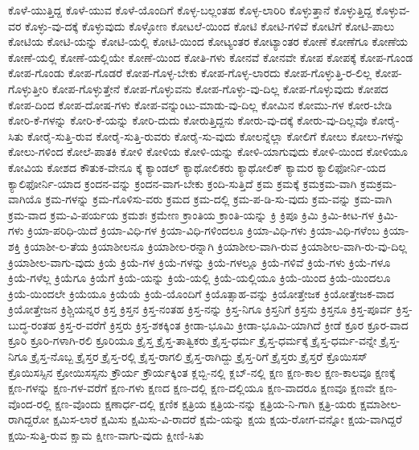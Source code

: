 {ಕೊಳೆ-ಯುತ್ತಿದ್ದ
ಕೊಳೆ-ಯುವ
ಕೊಳೆ-ಯೊಂದಿಗೆ
ಕೊಳ್ಳ-ಬಲ್ಲಂತಹ
ಕೊಳ್ಳ-ಲಾರಿರಿ
ಕೊಳ್ಳುತ್ತಾನೆ
ಕೊಳ್ಳುತ್ತಿದ್ದ
ಕೊಳ್ಳುವ-ವರ
ಕೊಳ್ಳು-ವು-ದಕ್ಕೆ
ಕೊಳ್ಳುವುದು
ಕೊಳ್ಳೋಣ
ಕೋಟಲೆ-ಯಿಂದ
ಕೋಟಿ
ಕೋಟಿ-ಗಳಿವೆ
ಕೋಟಿಗೆ
ಕೋಟಿ-ಪಾಲು
ಕೋಟಿಯ
ಕೋಟಿ-ಯನ್ನು
ಕೋಟಿ-ಯಲ್ಲಿ
ಕೋಟಿ-ಯಿಂದ
ಕೋಟ್ಯಂತರ
ಕೋಟ್ಯಾಂತರ
ಕೋಣೆ
ಕೋಣೆಗೂ
ಕೋಣೆಯ
ಕೋಣೆ-ಯಲ್ಲಿ
ಕೋಣೆ-ಯಲ್ಲಿಯೇ
ಕೋಣೆ-ಯಿಂದ
ಕೋತಿ-ಗಳು
ಕೋನವೆ
ಕೋನವೇ
ಕೋಪ
ಕೋಪಕ್ಕೆ
ಕೋಪ-ಗೊಂಡ
ಕೋಪ-ಗೊಂಡು
ಕೋಪ-ಗೊಡರೆ
ಕೋಪ-ಗೊಳ್ಳ-ಬೇಕು
ಕೋಪ-ಗೊಳ್ಳ-ಲಾರದು
ಕೋಪ-ಗೊಳ್ಳುತ್ತಿ-ರ-ಲಿಲ್ಲ
ಕೋಪ-ಗೊಳ್ಳುತ್ತೀರಿ
ಕೋಪ-ಗೊಳ್ಳುತ್ತೇನೆ
ಕೋಪ-ಗೊಳ್ಳುವನು
ಕೋಪ-ಗೊಳ್ಳು-ವು-ದಿಲ್ಲ
ಕೋಪ-ಗೊಳ್ಳುವುದು
ಕೋಪದ
ಕೋಪ-ದಿಂದ
ಕೋಪ-ದೋಷ-ಗಳು
ಕೋಪ-ವನ್ನುಂಟು-ಮಾಡು-ವು-ದಿಲ್ಲ
ಕೋಮಿನ
ಕೋಮು-ಗಳ
ಕೋರ-ಬೇಡಿ
ಕೋರಿ-ಕೆ-ಗಳನ್ನು
ಕೋರಿ-ಕೆ-ಯನ್ನು
ಕೋರಿ-ದುದು
ಕೋರುತ್ತಿದ್ದನು
ಕೋರು-ವು-ದಕ್ಕೆ
ಕೋರು-ವು-ದಿಲ್ಲವೊ
ಕೋರೈ-ಸಿತು
ಕೋರೈ-ಸುತ್ತಿ-ರುವ
ಕೋರೈ-ಸುತ್ತಿ-ರುವರು
ಕೋರೈ-ಸು-ವುದು
ಕೋಲನ್ನೆಲ್ಲಾ
ಕೋಲಿಗೆ
ಕೋಲು
ಕೋಲು-ಗಳನ್ನು
ಕೋಲು-ಗಳಿಂದ
ಕೋಲೆ-ಪಾತಕಿ
ಕೋಳಿ
ಕೋಳಿಯ
ಕೋಳಿ-ಯನ್ನು
ಕೋಳಿ-ಯಾಗುವುದು
ಕೋಳಿ-ಯಿಂದ
ಕೋಳಿಯೂ
ಕೋವಿಯ
ಕೋಶದ
ಕೌತುಕ-ವೇನೂ
ಕ್ಕೆ
ಕ್ಯಾಂಡಲ್
ಕ್ಯಾಥೋಲಿಕರು
ಕ್ಯಾಥೋಲಿಕ್
ಕ್ಯಾಮರ
ಕ್ಯಾಲಿಫೋರ್ನಿ-ಯದ
ಕ್ಯಾಲಿಫೋರ್ನಿ-ಯಾದ
ಕ್ರಂದನ-ವನ್ನು
ಕ್ರಂದನ-ವಾಗ-ಬೇಕು
ಕ್ರಂದಿ-ಸುತ್ತಿದೆ
ಕ್ರಮ
ಕ್ರಮಕ್ಕೆ
ಕ್ರಮಕ್ರಮ-ವಾಗಿ
ಕ್ರಮಕ್ರಮ-ವಾಗಿಯೊ
ಕ್ರಮ-ಗಳನ್ನು
ಕ್ರಮ-ಗೊಳಿಸು-ವರು
ಕ್ರಮದ
ಕ್ರಮ-ದಲ್ಲಿ
ಕ್ರಮ-ಪ-ಡಿ-ಸು-ವುದು
ಕ್ರಮ-ವನ್ನು
ಕ್ರಮ-ವಾಗಿ
ಕ್ರಮ-ವಾದ
ಕ್ರಮ-ವಿ-ಪರ್ಯಯ
ಕ್ರಮಶಃ
ಕ್ರಮೇಣ
ಕ್ರಾಂತಿಯ
ಕ್ರಾಂತಿ-ಯನ್ನು
ಕ್ರಿ
ಕ್ರಿಪೂ
ಕ್ರಿಮಿ
ಕ್ರಿಮಿ-ಕೀಟ-ಗಳ
ಕ್ರಿಮಿ-ಗಳು
ಕ್ರಿಯಾ-ಪರಿಧಿ-ಯಿದೆ
ಕ್ರಿಯಾ-ವಿಧಿ-ಗಳ
ಕ್ರಿಯಾ-ವಿಧಿ-ಗಳಿಂದಲೂ
ಕ್ರಿಯಾ-ವಿಧಿ-ಗಳು
ಕ್ರಿಯಾ-ವಿಧಿ-ಗಳೆಂಬ
ಕ್ರಿಯಾ-ಶಕ್ತಿ
ಕ್ರಿಯಾಶೀ-ಲ-ತೆಯ
ಕ್ರಿಯಾಶೀಲನೂ
ಕ್ರಿಯಾಶೀಲ-ರನ್ನಾಗಿ
ಕ್ರಿಯಾಶೀಲ-ವಾಗಿ-ರುವ
ಕ್ರಿಯಾಶೀಲ-ವಾಗಿ-ರು-ವು-ದಿಲ್ಲ
ಕ್ರಿಯಾಶೀಲ-ವಾಗು-ವುದು
ಕ್ರಿಯೆ
ಕ್ರಿಯೆ-ಗಳ
ಕ್ರಿಯೆ-ಗಳನ್ನು
ಕ್ರಿಯೆ-ಗಳಲ್ಲೂ
ಕ್ರಿಯೆ-ಗಳಿವೆ
ಕ್ರಿಯೆ-ಗಳು
ಕ್ರಿಯೆ-ಗಳೂ
ಕ್ರಿಯೆ-ಗಳೆಲ್ಲ
ಕ್ರಿಯೆಗೂ
ಕ್ರಿಯೆಗೆ
ಕ್ರಿಯೆ-ಯನ್ನು
ಕ್ರಿಯೆ-ಯಲ್ಲಿ
ಕ್ರಿಯೆ-ಯಲ್ಲಿಯೂ
ಕ್ರಿಯೆ-ಯಿಂದ
ಕ್ರಿಯೆ-ಯಿಂದಲೂ
ಕ್ರಿಯೆ-ಯಿಂದಲೇ
ಕ್ರಿಯೆಯೂ
ಕ್ರಿಯೆಯೆ
ಕ್ರಿಯೆ-ಯೊಂದಿಗೆ
ಕ್ರಿಯೊತ್ಸಾಹ-ವನ್ನು
ಕ್ರಿಯೋತ್ತೇಜಕ
ಕ್ರಿಯೋತ್ತೇಜಕ-ವಾದ
ಕ್ರಿಯೋತ್ತೇಜನ
ಕ್ರಿಶ್ಚಿಯನ್ನರ
ಕ್ರಿಸ್ತ
ಕ್ರಿಸ್ತನ
ಕ್ರಿಸ್ತ-ನಂತಹ
ಕ್ರಿಸ್ತ-ನನ್ನು
ಕ್ರಿಸ್ತ-ನಿಗೂ
ಕ್ರಿಸ್ತನಿಗೆ
ಕ್ರಿಸ್ತನು
ಕ್ರಿಸ್ತನೂ
ಕ್ರಿಸ್ತ-ಪೂರ್ವ
ಕ್ರಿಸ್ತ-ಬುದ್ಧ-ರಂತಹ
ಕ್ರಿಸ್ತ-ರ-ವರೆಗೆ
ಕ್ರಿಸ್ತರು
ಕ್ರಿಸ್ತ-ಶಕಕ್ಕಿಂತ
ಕ್ರೀಡಾ-ಭೂಮಿ
ಕ್ರೀಡಾ-ಭೂಮಿ-ಯಾಗಿದೆ
ಕ್ರೀಡೆ
ಕ್ರೂರ
ಕ್ರೂರ-ವಾದ
ಕ್ರೂರಿ
ಕ್ರೂರಿ-ಗಳಾಗಿ-ರಲಿ
ಕ್ರೂರಿಯೂ
ಕ್ರೈಸ್ತ
ಕ್ರೈಸ್ತ-ತಾತ್ವಿಕರು
ಕ್ರೈಸ್ತ-ಧರ್ಮ
ಕ್ರೈಸ್ತ-ಧರ್ಮಕ್ಕೆ
ಕ್ರೈಸ್ತ-ಧರ್ಮ-ವನ್ನೇ
ಕ್ರೈಸ್ತ-ನಿಗೂ
ಕ್ರೈಸ್ತ-ನೊಬ್ಬ
ಕ್ರೈಸ್ತರ
ಕ್ರೈಸ್ತ-ರಲ್ಲಿ
ಕ್ರೈಸ್ತ-ರಾಗಲಿ
ಕ್ರೈಸ್ತ-ರಾಗಿದ್ದು
ಕ್ರೈಸ್ತ-ರಿಗೆ
ಕ್ರೈಸ್ತರು
ಕ್ರೈಸ್ತರೆ
ಕ್ರೊಯಿಸಸ್
ಕ್ರೊಯಿಸಸ್ಸಿನ
ಕ್ರೋಯಿಸಸ್ಸನು
ಕ್ರೌರ್ಯ
ಕ್ರೌರ್ಯಕ್ಕಿಂತ
ಕ್ಲಬ್ಬಿ-ನಲ್ಲಿ
ಕ್ಲಬ್-ನಲ್ಲಿ
ಕ್ಷಣ
ಕ್ಷಣ-ಕಾಲ
ಕ್ಷಣ-ಕಾಲವೂ
ಕ್ಷಣಕ್ಕೆ
ಕ್ಷಣ-ಗಳನ್ನು
ಕ್ಷಣ-ಗಳ-ವರೆಗೆ
ಕ್ಷಣ-ಗಳು
ಕ್ಷಣದ
ಕ್ಷಣ-ದಲ್ಲಿ
ಕ್ಷಣ-ದಲ್ಲಿಯೂ
ಕ್ಷಣ-ವಾದರೂ
ಕ್ಷಣವೂ
ಕ್ಷಣವೇ
ಕ್ಷಣ-ವೊಂದ-ರಲ್ಲಿ
ಕ್ಷಣ-ವೊಂದು
ಕ್ಷಣಾರ್ಧ-ದಲ್ಲಿ
ಕ್ಷಣಿಕ
ಕ್ಷತ್ರಿಯ
ಕ್ಷತ್ರಿಯ-ನನ್ನು
ಕ್ಷತ್ರಿಯ-ನಿ-ಗಾಗಿ
ಕ್ಷತ್ರಿ-ಯರು
ಕ್ಷಮಾಶೀಲ-ರಾಗಿದ್ದರೋ
ಕ್ಷಮಿಸ-ಲಾರೆ
ಕ್ಷಮಿಸು
ಕ್ಷಮಿಸು-ವಿ-ರಾದರೆ
ಕ್ಷಮೆ-ಯನ್ನು
ಕ್ಷಯ
ಕ್ಷಯ-ರೋಗ-ವನ್ನೋ
ಕ್ಷಯ-ವಾಗಿದ್ದರೆ
ಕ್ಷಯಿ-ಸುತ್ತಿ-ರುವ
ಕ್ಷಾಮ
ಕ್ಷೀಣ-ವಾಗು-ವುದು
ಕ್ಷೀಣಿ-ಸಿತು
}
